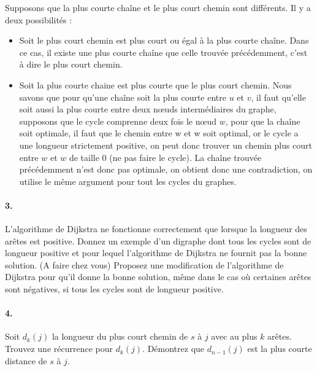 \begin{solution}
  Supposons que la plus courte chaîne et le plus court chemin sont différents. Il y a deux possibilités :
  \begin{itemize}
    \item Soit le plus court chemin est plus court ou égal à la plus courte chaîne. Dans ce cas, il existe une plus courte chaîne que celle trouvée précédemment, c'est à dire le plus court chemin.
    \item Soit la plus courte chaine est plus courte que le plus court chemin.
      Nous savons que pour qu'une chaîne soit la plus courte entre $u$ et $v$,
      il faut qu'elle soit aussi la plus courte entre deux nœuds intermédiaires du graphe,
      supposons que le cycle comprenne deux fois le nœud $w$,
      pour que la chaîne soit optimale, il faut que le chemin entre w et w soit optimal,
      or le cycle a une longueur strictement positive,
      on peut donc trouver un chemin plus court entre $w$ et $w$ de taille 0 (ne pas faire le cycle).
      La chaîne trouvée précédemment n'est donc pas optimale, on obtient donc une contradiction,
      on utilise le même argument pour tout les cycles du graphes.
  \end{itemize}
\end{solution}

\paragraph{3. } L'algorithme de Dijkstra ne fonctionne correctement que lorsque la longueur des arêtes est positive. Donnez un exemple d'un digraphe dont tous les cycles sont de longueur positive et pour lequel l'algorithme de Dijkstra ne fournit pas la bonne solution. (A faire chez vous) Proposez une modification de l'algorithme de Dijkstra pour qu'il donne la bonne solution, même dans le cas où certaines arêtes sont négatives, si tous les cycles sont de longueur positive.

\begin{solution}
  \nosolution
\end{solution}

\paragraph{4. } Soit $d_k(j)$ la longueur du plus court chemin de $s$ à $j$ avec au plus $k$ arêtes. Trouvez une récurrence pour $d_k(j)$. Démontrez que $d_{n-1}(j)$ est la plus courte distance de $s$ à $j$.

\begin{solution}
  \nosolution
\end{solution}

